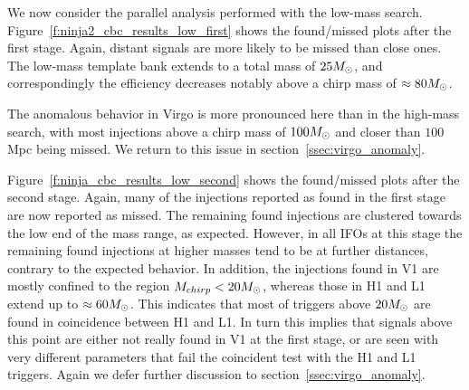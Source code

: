 We now consider the parallel analysis performed with the low-mass
search.  Figure~\ref{f:ninja2_cbc_results_low_first} shows the
found/missed plots after the first stage.  Again, distant signals are
more likely to be missed than close ones.  The low-mass template bank
extends to a total mass of $25M_\odot$, and correspondingly the
efficiency decreases notably above a chirp mass of $\approx 80 M_\odot$.

The anomalous behavior in Virgo is more pronounced here than in the
high-mass search, with most injections above a chirp mass of $100
M_\odot$ and closer than $100$ Mpc being missed.  We return to this
issue in section~\ref{ssec:virgo_anomaly}.

Figure~\ref{f:ninja_cbc_results_low_second} shows the found/missed
plots after the second stage.  Again, many of the injections reported
as found in the first stage are now reported as missed.  The remaining
found injections are clustered towards the low end of the mass range,
as expected.  However, in all IFOs at this stage the remaining found
injections at higher masses tend to be at further distances, contrary
to the expected behavior.  In addition, the injections found in V1 are
mostly confined to the region $M_{chirp} < 20 M_\odot$, whereas those in
H1 and L1 extend up to $\approx 60 M_\odot$.  This indicates that most
of triggers above $20 M_\odot$ are found in coincidence between H1 and
L1.  In turn this implies that signals above this point are either not
really found in V1 at the first stage, or are seen with very different 
parameters that fail the coincident test with the H1 and L1 triggers.
Again we defer further discussion to section~\ref{ssec:virgo_anomaly}.


